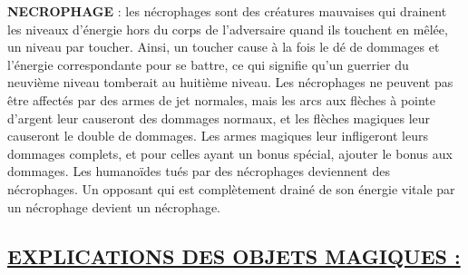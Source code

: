 \label{monstre-necrophage}\textbf{NECROPHAGE} : les nécrophages sont des créatures mauvaises qui drainent les niveaux d'énergie hors du corps de l'adversaire quand ils touchent en mêlée, un niveau par toucher. Ainsi, un toucher cause à la fois le dé de dommages et l'énergie correspondante pour se battre, ce qui signifie qu'un guerrier du neuvième niveau tomberait au huitième niveau. Les nécrophages ne peuvent pas être affectés par des armes de jet normales, mais les arcs aux flèches à pointe d'argent leur causeront des dommages normaux, et les flèches magiques leur causeront le double de dommages. Les armes magiques leur infligeront leurs dommages complets, et pour celles ayant un bonus spécial, ajouter le bonus aux dommages. Les humanoïdes tués par des nécrophages deviennent des nécrophages. Un opposant qui est complètement drainé de son énergie vitale par un nécrophage devient un nécrophage.

\subsection*{\uline{EXPLICATIONS DES OBJETS MAGIQUES :}}


